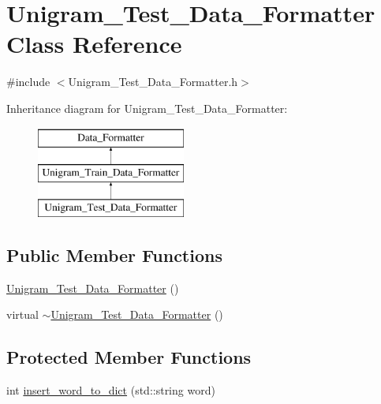 \hypertarget{class_unigram___test___data___formatter}{
\section{Unigram\_\-Test\_\-Data\_\-Formatter Class Reference}
\label{class_unigram___test___data___formatter}
}


{\ttfamily \#include $<$Unigram\_\-Test\_\-Data\_\-Formatter.h$>$}

Inheritance diagram for Unigram\_\-Test\_\-Data\_\-Formatter:\begin{figure}[H]
\begin{center}
\leavevmode
\includegraphics[height=3cm]{class_unigram___test___data___formatter}
\end{center}
\end{figure}
\subsection*{Public Member Functions}
\begin{DoxyCompactItemize}
\item 
\hyperlink{class_unigram___test___data___formatter_ac495e776f722de2442f5e5c93e6d52c7}{Unigram\_\-Test\_\-Data\_\-Formatter} ()
\item 
virtual \hyperlink{class_unigram___test___data___formatter_a1091536b137e25af7163dc70913da52d}{$\sim$Unigram\_\-Test\_\-Data\_\-Formatter} ()
\end{DoxyCompactItemize}
\subsection*{Protected Member Functions}
\begin{DoxyCompactItemize}
\item 
int \hyperlink{class_unigram___test___data___formatter_a0bbe30a897b9e2a01795ef3ccae38612}{insert\_\-word\_\-to\_\-dict} (std::string word)
\end{DoxyCompactItemize}



